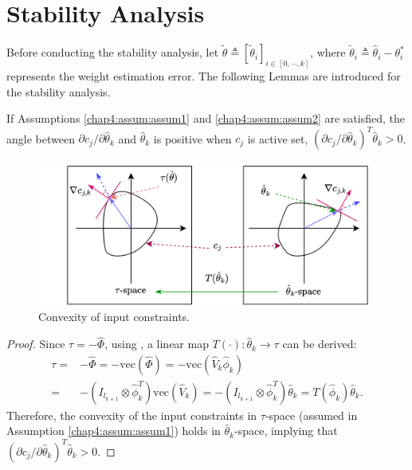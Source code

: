\section{Stability Analysis} 

Before conducting the stability analysis, let $\tilde\theta\triangleq [\tilde\theta_i]_{i\in[0,\cdots,k]}$, where $\tilde\theta_i\triangleq\hat\theta_i-\theta^*_i$ represents the weight estimation error. The following Lemmas are introduced for the stability analysis. %
\begin{lemma}
    If Assumptions \ref{chap4:assum:assum1} and \ref{chap4:assum:assum2} are satisfied, the angle between $\partial c_j/\partial \hat\theta_k$ and $\hat\theta_k$ is positive when $c_j$ is active set, \ie $(\partial c_j/\partial \hat\theta_k)^T\hat\theta_k>0$.
    \label{chap4:lem:lem1}
\end{lemma}

\begin{figure}[!t]
   \centering
   \includegraphics[width=.9\linewidth]{imgs/spaces.drawio.png}
   \caption{Convexity of input constraints.}
   \label{chap4:fig:spaces}
\end{figure}

\begin{proof}

Since $\tau = -\hat\Phi$, using \cite[Proposition 7.1.9]{RN22}, a linear map $T(\cdot):\hat\theta_k\to\tau$ can be derived: 
\begin{equation}
    \begin{aligned}
    \tau = &-\hat\Phi = -\text{vec}(\hat\Phi)     
    = -\text{vec}(\hat V_k \hat\phi_k) 
    \\
    = & -(I_{l_{k+1}}\otimes \hat\phi_k^T)\text{vec}(\hat V_k)
    =-(I_{l_{k+1}}\otimes \hat\phi_k^T)\hat\theta_k = T(\hat\phi_k) \hat\theta_k
    .
    \end{aligned}
    \label{chap4:eq:linear map}
\end{equation}
Therefore, the convexity of the input constraints in $\tau$-space (assumed in Assumption \ref{chap4:assum:assum1}) holds in $\hat\theta_k$-space, implying
that $(\partial c_j/\partial \hat\theta_k)^T\hat\theta_k>0$.

\end{proof}

